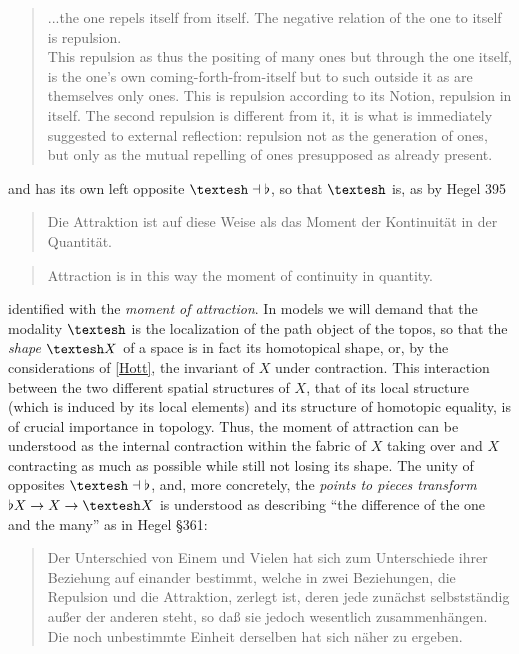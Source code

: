 \documentclass{article}
\begin{document}
\begin{quote}
    ...the one repels itself from itself. The negative relation of the one to itself is repulsion.\\
    
    This repulsion as thus the positing of many ones but through the one itself, is the one’s own coming-forth-from-itself but to such outside it as are themselves only ones. This is repulsion according to its Notion, repulsion in itself. The second repulsion is different from it, it is what is immediately suggested to external reflection: repulsion not as the generation of ones, but only as the mutual repelling of ones presupposed as already present.
\end{quote}

and has its own left opposite $\textrm{\textesh}\dashv\flat$, so that $\textrm{\textesh}$ is, as by Hegel 395

\begin{quote}
    Die Attraktion ist auf diese Weise als das Moment der Kontinuität in der Quantität.
\end{quote}

\begin{quote}
    Attraction is in this way the moment of continuity in quantity.
\end{quote}

identified with the \emph{moment of attraction}. In models we will demand that the modality $\textrm{\textesh}$ is the localization of the path object of the topos, so that the \emph{shape} $\textrm{\textesh} X$ of a space is in fact its homotopical shape, or, by the considerations of \ref{Hott}, the invariant of $X$ under contraction. This interaction between the two different spatial structures of $X$, that of its local structure (which is induced by its local elements) and its structure of homotopic equality, is of crucial importance in topology. Thus, the moment of attraction can be understood as the internal contraction within the fabric of $X$ taking over and $X$ contracting as much as possible while still not losing its shape. The unity of opposites $\textrm{\textesh}\dashv\flat$, and, more concretely, the \emph{points to pieces transform} $\flat X\rightarrow X\rightarrow \textrm{\textesh} X$ is understood as describing ``the difference of the one and the many'' as in Hegel §361:

\begin{quote}
    Der Unterschied von Einem und Vielen hat sich zum Unterschiede ihrer Beziehung auf einander bestimmt, welche in zwei Beziehungen, die Repulsion und die Attraktion, zerlegt ist, deren jede zunächst selbstständig außer der anderen steht, so daß sie jedoch wesentlich zusammenhängen. Die noch unbestimmte Einheit derselben hat sich näher zu ergeben.
\end{quote}
    
\end{document}
